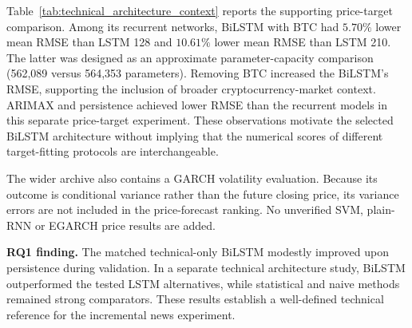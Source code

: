 \begin{table}[!htbp]
\centering\small
\caption{Supporting technical-only architecture experiment on common later-period price targets. Neural values are means of five runs; ARIMAX and persistence are single-fit/deterministic comparators. This is a distinct training-target experiment from the matched E0--E4 study.}
\label{tab:technical_architecture_context}
\end{table}

Table~\ref{tab:technical_architecture_context} reports the supporting price-target comparison. Among its recurrent networks, BiLSTM with BTC had $5.70\%$ lower mean RMSE than LSTM 128 and $10.61\%$ lower mean RMSE than LSTM 210. The latter was designed as an approximate parameter-capacity comparison (562,089 versus 564,353 parameters). Removing BTC increased the BiLSTM's RMSE, supporting the inclusion of broader cryptocurrency-market context. ARIMAX and persistence achieved lower RMSE than the recurrent models in this separate price-target experiment. These observations motivate the selected BiLSTM architecture without implying that the numerical scores of different target-fitting protocols are interchangeable.

The wider archive also contains a GARCH volatility evaluation. Because its outcome is conditional variance rather than the future closing price, its variance errors are not included in the price-forecast ranking. No unverified SVM, plain-RNN or EGARCH price results are added.

\noindent\textbf{RQ1 finding.} The matched technical-only BiLSTM modestly improved upon persistence during validation. In a separate technical architecture study, BiLSTM outperformed the tested LSTM alternatives, while statistical and naive methods remained strong comparators. These results establish a well-defined technical reference for the incremental news experiment.


